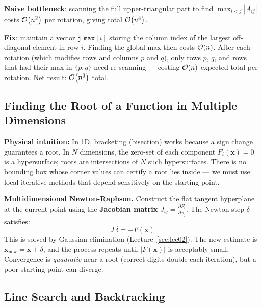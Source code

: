 \begin{tcolorbox}[colback=blue!5!white,colframe=blue!75!black,
  title=Optimisation: Row-Maximum Vector ($\bigO{n^4} \to \bigO{n^3}$)]
\textbf{Naive bottleneck}: scanning the full upper-triangular part to find
$\max_{i<j}|A_{ij}|$ costs $\mathcal{O}\!\left(n^2\right)$ per rotation, giving total
$\mathcal{O}\!\left(n^4\right)$.

\textbf{Fix}: maintain a vector $\mathtt{j\_max}[i]$ storing the column index
of the largest off-diagonal element in row $i$. Finding the global max then
costs $\mathcal{O}\!\left(n\right)$. After each rotation (which modifies rows and columns $p$
and $q$), only rows $p$, $q$, and rows that had their max in $\{p,q\}$ need
re-scanning — costing $\mathcal{O}\!\left(n\right)$ expected total per rotation. Net result:
$\mathcal{O}\!\left(n^3\right)$ total.
\end{tcolorbox}

\subsection{Finding the Root of a Function in Multiple Dimensions}

\noindent\textbf{Physical intuition:} In 1D, bracketing (bisection) works
because a sign change guarantees a root. In $N$ dimensions, the zero-set of
each component $F_i(\mathbf{x}) = 0$ is a hypersurface; roots are
intersections of $N$ such hypersurfaces. There is no bounding box whose
corner values can certify a root lies inside — we must use local iterative
methods that depend sensitively on the starting point.

\textbf{Multidimensional Newton-Raphson.} Construct the flat tangent
hyperplane at the current point using the \textbf{Jacobian matrix}
$J_{ij} = \frac{\partial F_i}{\partial x_j}$. The Newton step $\delta$
satisfies:
\begin{equation}
\boxed{J\,\delta = -F(\mathbf{x})}
\end{equation}
This is solved by Gaussian elimination (Lecture~\ref{sec:lec02}). The new
estimate is $\mathbf{x}_{\text{new}} = \mathbf{x} + \delta$, and the process
repeats until $|F(\mathbf{x})|$ is acceptably small. Convergence is
\emph{quadratic} near a root (correct digits double each iteration), but a
poor starting point can diverge.

\subsection{Line Search and Backtracking}\label{subsec:linesearch}

